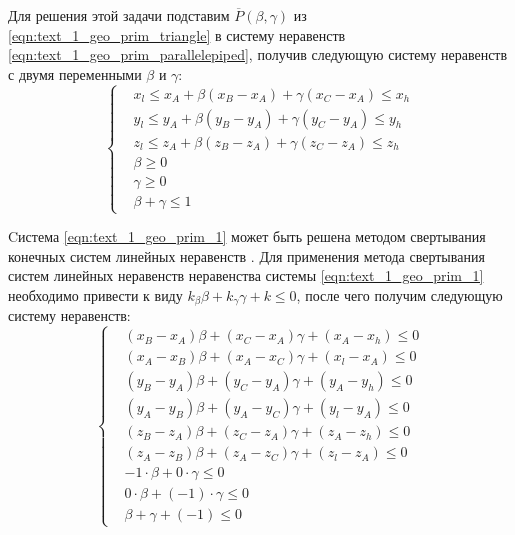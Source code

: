 Для решения этой задачи подставим $\overline{P}(\beta, \gamma)$ из \eqref{eqn:text_1_geo_prim_triangle} в систему неравенств \eqref{eqn:text_1_geo_prim_parallelepiped}, получив следующую систему неравенств с двумя переменными $\beta$ и $\gamma$:
\begin{equation}\label{eqn:text_1_geo_prim_1}
	\left\{
		\begin{aligned}
			& x_l \le x_A + \beta (x_B - x_A) + \gamma (x_C - x_A) \le x_h \\
			& y_l \le y_A + \beta (y_B - y_A) + \gamma (y_C - y_A) \le y_h \\
			& z_l \le z_A + \beta (z_B - z_A) + \gamma (z_C - z_A) \le z_h \\
			& \beta \ge 0 \\
			& \gamma \ge 0 \\
			& \beta + \gamma \le 1
		\end{aligned}
	\right.
\end{equation}

Cистема \eqref{eqn:text_1_geo_prim_1} может быть решена методом свертывания конечных систем линейных неравенств \cite{Chernikov1963}.
Для применения метода свертывания систем линейных неравенств неравенства системы \eqref{eqn:text_1_geo_prim_1} необходимо привести к виду $k_{\beta}\beta + k_{\gamma}\gamma + k \le 0$, после чего получим следующую систему неравенств:
\begin{equation}\label{eqn:text_1_geo_prim_2}
	\left\{
		\begin{aligned}
			& (x_B - x_A) \beta + (x_C - x_A) \gamma + (x_A - x_h) \le 0 \\
			& (x_A - x_B) \beta + (x_A - x_C) \gamma + (x_l - x_A) \le 0 \\
			& (y_B - y_A) \beta + (y_C - y_A) \gamma + (y_A - y_h) \le 0 \\
			& (y_A - y_B) \beta + (y_A - y_C) \gamma + (y_l - y_A) \le 0 \\
			& (z_B - z_A) \beta + (z_C - z_A) \gamma + (z_A - z_h) \le 0 \\
			& (z_A - z_B) \beta + (z_A - z_C) \gamma + (z_l - z_A) \le 0 \\
			& -1 \cdot \beta + 0 \cdot \gamma \le 0 \\
			& 0 \cdot \beta + (-1) \cdot \gamma \le 0 \\
			& \beta + \gamma + (-1) \le 0
		\end{aligned}
	\right.
\end{equation}

